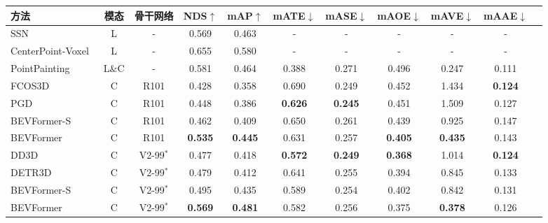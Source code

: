\begin{tabular}{l  c c |c c| c c c c c c }
\toprule
方法 &  模态 & 骨干网络 & NDS$\uparrow$  & mAP$\uparrow$  & mATE$\downarrow$     & mASE$\downarrow$     & mAOE$\downarrow$     & mAVE$\downarrow$    & mAAE$\downarrow$    \\
\midrule

SSN~\cite{zhu2020ssn} &L &-& 0.569 &0.463 &-&-&-&-&-\\
CenterPoint-Voxel~\cite{yin2021center} & L &-& 0.655 & 0.580  & - &- &- &- &- \\
PointPainting~\cite{vora2020pointpainting}& L$\!\&\!$C&-&0.581 &0.464 &0.388&0.271&0.496&0.247&0.111\\
\midrule

FCOS3D~\cite{wang2021fcos3d}  & C  & R101& 0.428 &0.358& 0.690& 0.249& 0.452& 1.434 &\textbf{0.124} \\
PGD~\cite{wang2022probabilistic}  & C &  R101&0.448 &0.386& \textbf{0.626}& \textbf{0.245} &0.451 &1.509 &0.127 \\
\rowcolor{gray95}
BEVFormer-S    & C & R101& 0.462& 0.409 & 0.650 & 0.261 & 0.439 & 0.925 & 0.147 \\
\rowcolor{gray9}
BEVFormer    & C & R101& \textbf{0.535}& \textbf{0.445} & 0.631 & 0.257 & \textbf{0.405} & \textbf{0.435} & 0.143 \\
\midrule
DD3D~\cite{park2021pseudo}  & C &V2-99$^*$& 0.477 &0.418& \textbf{0.572} & \textbf{0.249} &\textbf{0.368} &1.014 &\textbf{0.124} \\

DETR3D~\cite{wang2022detr3d}  & C &  V2-99$^*$& 0.479 & 0.412 &0.641& 0.255 &0.394 &0.845& 0.133\\
\rowcolor{gray95}
BEVFormer-S& C &V2-99$^*$ & 0.495& 0.435 & 0.589&0.254 & 0.402 &0.842 & 0.131 \\
\rowcolor{gray9}
BEVFormer& C &V2-99$^*$ & \textbf{0.569}& \textbf{0.481} & 0.582&0.256 & 0.375 & \textbf{0.378} & 0.126 \\

\bottomrule
\end{tabular}